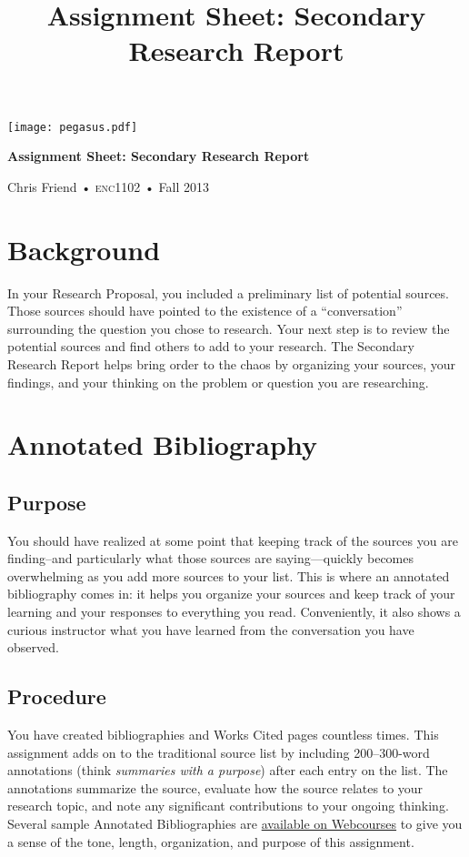 \documentclass[11pt]{amsart}	%
\title[Secondary Research Report]{Assignment Sheet: Secondary Research Report}
\begin{document}
%
\thispagestyle{empty}

\vspace{-2in}
\begin{center}
\huge
\texttt{[image: pegasus.pdf]}

\textbf{Assignment Sheet: Secondary Research Report}

{\normalsize Chris Friend • \textsc{enc1102} • Fall 2013}
\end{center}
\vspace{1.5\baselineskip}

\section{Background} %
\label{sec:background}
In your Research Proposal, you included a preliminary list of potential sources. Those sources should have pointed to the existence of a “conversation” surrounding the question you chose to research. Your next step is to review the potential sources and find others to add to your research. The Secondary Research Report helps bring order to the chaos by organizing your sources, your findings, and your thinking on the problem or question you are researching.


\section{Annotated Bibliography} %
\label{sec:annotated_bibliography}

\subsection{Purpose} %
\label{sec:bib-purpose}
You should have realized at some point that keeping track of the sources you are finding–and particularly what those sources are saying—quickly becomes overwhelming as you add more sources to your list. This is where an annotated bibliography comes in: it helps you organize your sources and keep track of your learning and your responses to everything you read. Conveniently, it also shows a curious instructor what you have learned from the conversation you have observed.

\subsection{Procedure} %
\label{sec:bib-procedure}
You have created bibliographies and Works Cited pages countless times. This assignment adds on to the traditional source list by including 200–300-word annotations (think \emph{summaries with a purpose}) after each entry on the list. The annotations summarize the source, evaluate how the source relates to your research topic, and note any significant contributions to your ongoing thinking. Several sample Annotated Bibliographies are \href{https://webcourses2c.instructure.com/courses/985581/files#ENC1102_CMB-13Fall%2FSample%20SRRs}{available on Webcourses} to give you a sense of the tone, length, organization, and purpose of this assignment.
\end{document}
